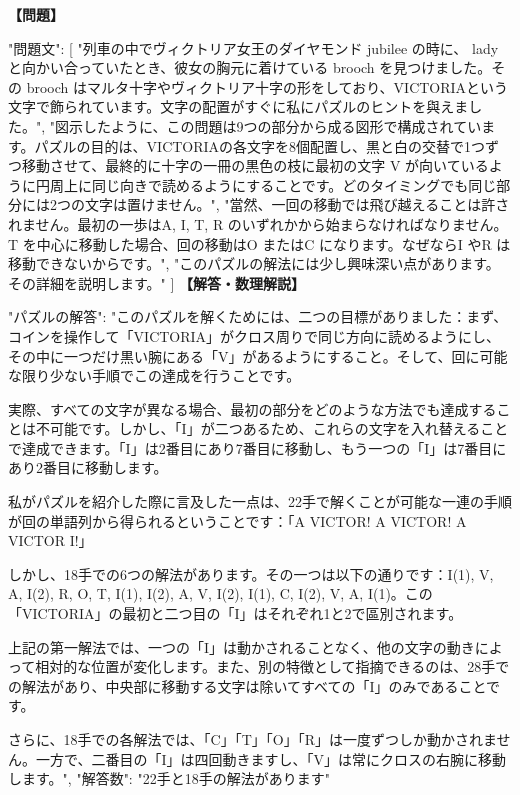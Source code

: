\documentclass[10pt,a4paper,oneside,openany]{ltjsbook}
\begin{document}
\begin{tcolorbox}[colback=softblue,colframe=primaryblue,title=\textbf{第 218 問：THE VICTORIA CROSS PUZZLE.},arc=2mm,boxrule=1pt,breakable]
\textbf{【問題】}\par\vspace{0.3em}
{
    "問題文": [
        "列車の中でヴィクトリア女王のダイヤモンド jubilee の時に、 lady と向かい合っていたとき、彼女の胸元に着けている brooch を見つけました。その brooch はマルタ十字やヴィクトリア十字の形をしており、VICTORIAという文字で飾られています。文字の配置がすぐに私にパズルのヒントを與えました。",
        "図示したように、この問題は9つの部分から成る図形で構成されています。パズルの目的は、VICTORIAの各文字を8個配置し、黒と白の交替で1つずつ移動させて、最終的に十字の一冊の黒色の枝に最初の文字 V が向いているように円周上に同じ向きで読めるようにすることです。どのタイミングでも同じ部分には2つの文字は置けません。",
        "當然、一回の移動では飛び越えることは許されません。最初の一歩はA, I, T, R のいずれかから始まらなければなりません。T を中心に移動した場合、回の移動はO またはC になります。なぜならI やR は移動できないからです。",
        "このパズルの解法には少し興味深い点があります。その詳細を説明します。"
    ]
}
\tcblower
\textbf{【解答・数理解説】}\par\vspace{0.3em}
{
"パズルの解答": "このパズルを解くためには、二つの目標がありました：まず、コインを操作して「VICTORIA」がクロス周りで同じ方向に読めるようにし、その中に一つだけ黒い腕にある「V」があるようにすること。そして、回に可能な限り少ない手順でこの達成を行うことです。

実際、すべての文字が異なる場合、最初の部分をどのような方法でも達成することは不可能です。しかし、「I」が二つあるため、これらの文字を入れ替えることで達成できます。「I」は2番目にあり7番目に移動し、もう一つの「I」は7番目にあり2番目に移動します。

私がパズルを紹介した際に言及した一点は、22手で解くことが可能な一連の手順が回の単語列から得られるということです：「A VICTOR! A VICTOR! A VICTOR I!」

しかし、18手での6つの解法があります。その一つは以下の通りです：I(1), V, A, I(2), R, O, T, I(1), I(2), A, V, I(2), I(1), C, I(2), V, A, I(1)。この「VICTORIA」の最初と二つ目の「I」はそれぞれ1と2で區別されます。

上記の第一解法では、一つの「I」は動かされることなく、他の文字の動きによって相対的な位置が変化します。また、別の特徴として指摘できるのは、28手での解法があり、中央部に移動する文字は除いてすべての「I」のみであることです。

さらに、18手での各解法では、「C」「T」「O」「R」は一度ずつしか動かされません。一方で、二番目の「I」は四回動きますし、「V」は常にクロスの右腕に移動します。",
"解答数": "22手と18手の解法があります"
}
\end{tcolorbox}
\end{document}
